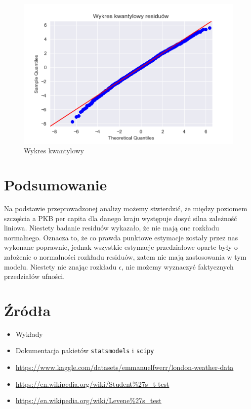 \documentclass{article}
\theoremstyle{break}
\newcommand{\code}[1]{\colorbox{light-gray}{\texttt{#1}}}
\begin{document}
	\begin{figure}[H]
		\begin{center}
			\includegraphics[scale=0.63]{res_qq.png}
			\caption{Wykres kwantylowy}
			\label{fig:res_qq}
		\end{center}
	\end{figure}
	
	\section{Podsumowanie}
	
	Na podstawie przeprowadzonej analizy możemy stwierdzić, że między poziomem szczęścia a PKB per capita dla danego kraju występuje dosyć silna zależność liniowa. Niestety badanie residuów wykazało, że nie mają one rozkładu normalnego. Oznacza to, że co prawda punktowe estymacje zostały przez nas wykonane poprawnie, jednak wszystkie estymacje przedziałowe oparte były o założenie o normalności rozkładu residuów, zatem nie mają zastosowania w tym modelu. Niestety nie znając rozkładu $\epsilon$, nie możemy wyznaczyć faktycznych przedziałów ufności.
	
	\section{Źródła}
	\begin{itemize}
		\item Wykłady
		\item Dokumentacja pakietów \code{statsmodels} i \code{scipy}
		\item \url{https://www.kaggle.com/datasets/emmanuelfwerr/london-weather-data}
		\item \url{https://en.wikipedia.org/wiki/Student%27s_t-test}
		\item \url{https://en.wikipedia.org/wiki/Levene%27s_test}
		
	\end{itemize}
	
	
\end{document}
